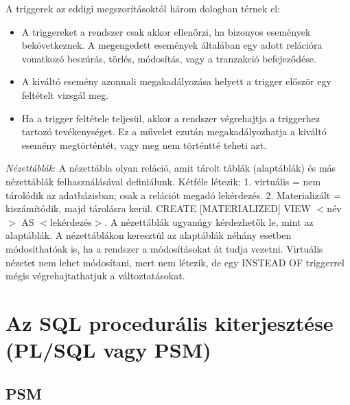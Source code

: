 \documentclass[margin=0px]{article}
\begin{document}
	A triggerek az eddigi megszorításoktól három dologban térnek el:
	\begin{itemize}
		\item A triggereket a rendszer csak akkor ellenőrzi, ha bizonyos események bekövetkeznek. A megengedett események általában egy adott relációra vonatkozó beszúrás, törlés, módosítás, vagy a tranzakció befejeződése.
		\item A kiváltó esemény azonnali megakadályozása helyett a trigger először egy feltételt vizsgál meg.
		\item Ha a trigger feltétele teljesül, akkor a rendszer végrehajtja a triggerhez tartozó tevékenységet. Ez a művelet ezután megakadályozhatja a kiváltó esemény megtörténtét, vagy meg nem történtté teheti azt.
	\end{itemize}
	\textit{Nézettáblák}: A nézettábla olyan reláció, amit tárolt táblák (alaptáblák) és más nézettáblák felhasználásával definiálunk. Kétféle létezik: 1. virtuális = nem tárolódik az adatbázisban; csak a relációt megadó lekérdezés. 2. Materializált = kiszámítódik, majd tárolásra
	kerül. CREATE [MATERIALIZED] VIEW $<$név$>$ AS $<$lekérdezés$>$. A nézettáblák ugyanúgy kérdezhetők le, mint az alaptáblák. A nézettáblákon keresztül az alaptáblák néhány esetben módosíthatóak is, ha a rendszer a módosításokat át tudja vezetni. Virtuális nézetet nem lehet módosítani, mert nem létezik, de egy INSTEAD OF triggerrel mégis végrehajtathatjuk a változtatásokat.

	\section{Az SQL procedurális kiterjesztése (PL/SQL vagy PSM)}
	
	\subsection{PSM}
	
\end{document}
